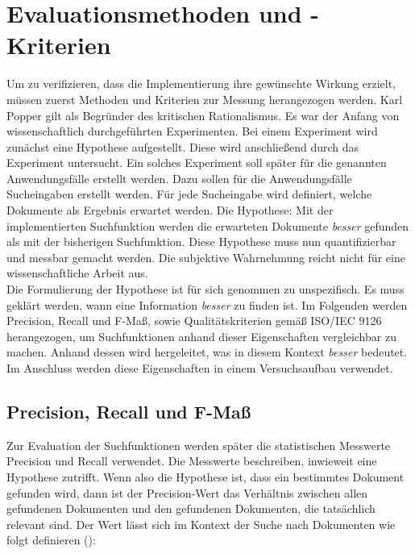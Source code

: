 \chapter{Evaluationsmethoden und -Kriterien}
\label{chap:evaluationsmethoden}

Um zu verifizieren, dass die Implementierung ihre gewünschte Wirkung erzielt, müssen zuerst Methoden und Kriterien zur Messung herangezogen werden.
Karl Popper gilt als Begründer des kritischen Rationalismus.
Es war der Anfang von wissenschaftlich durchgeführten Experimenten.
Bei einem Experiment wird zunächst eine Hypothese aufgestellt.
Diese wird anschließend durch das Experiment untersucht.
Ein solches Experiment soll später für die genannten Anwendungsfälle erstellt werden.
Dazu sollen für die Anwendungsfälle Sucheingaben erstellt werden.
Für jede Sucheingabe wird definiert, welche Dokumente als Ergebnis erwartet werden.
Die Hypothese: Mit der implementierten Suchfunktion werden die erwarteten Dokumente \textit{besser} gefunden als mit der bisherigen Suchfunktion.
Diese Hypothese muss nun quantifizierbar und messbar gemacht werden.
Die subjektive Wahrnehmung reicht nicht für eine wissenschaftliche Arbeit aus.\\

Die Formulierung der Hypothese ist für sich genommen zu unspezifisch.
Es muss geklärt werden, wann eine Information \textit{besser} zu finden ist.
Im Folgenden werden Precision, Recall und F-Maß, sowie Qualitätskriterien gemäß ISO/IEC 9126 herangezogen, um Suchfunktionen anhand dieser Eigenschaften vergleichbar zu machen.
Anhand dessen wird hergeleitet, was in diesem Kontext \textit{besser} bedeutet.
Im Anschluss werden diese Eigenschaften in einem Versuchsaufbau verwendet. 

\section{Precision, Recall und F-Maß}
Zur Evaluation der Suchfunktionen werden später die statistischen Messwerte Precision und Recall verwendet.
Die Messwerte beschreiben, inwieweit eine Hypothese zutrifft.
Wenn also die Hypothese ist, dass ein bestimmtes Dokument gefunden wird, dann ist der Precision-Wert das Verhältnis zwischen allen gefundenen Dokumenten und den gefundenen Dokumenten, die tatsächlich relevant sind.
Der Wert lässt sich im Kontext der Suche nach Dokumenten wie folgt definieren (\cite{Sirotkin_2012}):\\

